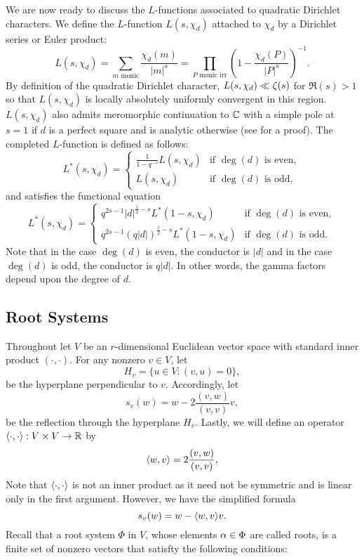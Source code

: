         We are now ready to discuss the $L$-functions associated to quadratic Dirichlet characters. We define the $L$-function $L(s,\chi_{d})$ attached to $\chi_{d}$ by a Dirichlet series or Euler product:
        \[
            L(s,\chi_{d}) = \sum_{\text{$m$ monic}}\frac{\chi_{d}(m)}{|m|^{s}} = \prod_{\text{$P$ monic irr}}\left(1-\frac{\chi_{d}(P)}{|P|^{s}}\right)^{-1}.
        \]
        By definition of the quadratic Dirichlet character, $L(s,\chi_{d}) \ll \zeta(s)$ for $\Re(s) > 1$ so that $L(s,\chi_{d})$ is locally absolutely uniformly convergent in this region. $L(s,\chi_{d})$ also admits meromorphic continuation to $\mathbb{C}$ with a simple pole at $s = 1$ if $d$ is a perfect square and is analytic otherwise (see \cite{rosen2002number} for a proof). The completed $L$-function is defined as follows:
        \[
            L^{\ast}(s,\chi_{d}) = \begin{cases} \frac{1}{1-q^{-s}}L(s,\chi_{d}) & \text{if $\deg(d)$ is even}, \\ L(s,\chi_{d}) & \text{if $\deg(d)$ is odd}, \end{cases}
        \]
        and satisfies the functional equation
        \[
            L^{\ast}(s,\chi_{d}) = \begin{cases} q^{2s-1}|d|^{\frac{1}{2}-s}L^{\ast}(1-s,\chi_{d}) & \text{if $\deg(d)$ is even}, \\ q^{2s-1}(q|d|)^{\frac{1}{2}-s}L^{\ast}(1-s,\chi_{d}) & \text{if $\deg(d)$ is odd}. \end{cases}
        \]
        Note that in the case $\deg(d)$ is even, the conductor is $|d|$ and in the case $\deg(d)$ is odd, the conductor is $q|d|$. In other words, the gamma factors depend upon the degree of $d$.
    \subsection*{Root Systems}
        Throughout let $V$ be an $r$-dimensional Euclidean vector space with standard inner product $(\cdot,\cdot)$. For any nonzero $v \in V$, let
        \[
            H_{v} = \{u \in V:(v,u) = 0\},
        \]
        be the hyperplane perpendicular to $v$. Accordingly, let
        \[
            s_{v}(w) = w-2\frac{(v,w)}{(v,v)}v, 
        \]
        be the reflection through the hyperplane $H_{v}$. Lastly, we will define an operator $\langle\cdot,\cdot\rangle:V \times V \to \mathbb{R}$ by
        \[
            \langle w,v\rangle = 2\frac{(v,w)}{(v,v)},
        \]
        Note that $\langle\cdot,\cdot\rangle$ is not an inner product as it need not be symmetric and is linear only in the first argument. However, we have the simplified formula
        \[
            s_{v}(w) = w-\langle w,v\rangle v.
        \]
        Recall that a root system $\Phi$ in $V$, whose elements $\alpha \in \Phi$ are called roots, is a finite set of nonzero vectors that satisfty the following conditions:

